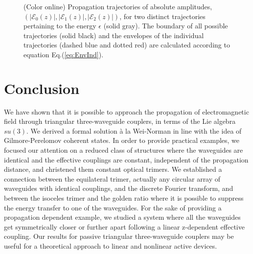 \documentclass[9pt,twocolumn,twoside]{osajnl}
\begin{document}
\begin{figure}[htbp]
	\centering
	\caption{(Color online) Propagation trajectories of absolute amplitudes, $(\vert \mathcal{E}_{0}(z) \vert, \vert \mathcal{E}_{1}(z) \vert, \vert \mathcal{E}_{2}(z) \vert )$,  for two 
		distinct trajectories pertaining to the energy $\epsilon$ (solid gray). The boundary of all possible trajectories (solid black) and the envelopes of the individual  trajectories (dashed blue and dotted red) are calculated according to equation Eq.(\ref{eq:EnvInd}).} 
	
	\label{fig:Fig8}
\end{figure}


\section{Conclusion}
We have shown that it is possible to approach the propagation of electromagnetic field through triangular three-waveguide couplers, in terms of the Lie algebra $su(3)$. 
We derived a formal solution \`a la Wei-Norman in line with the idea of Gilmore-Perelomov coherent states.
In order to provide practical examples, we focused our attention on a reduced class of structures where the waveguides are identical and the effective couplings are constant, independent of the propagation distance, and christened them constant optical trimers. 
We established a connection between the equilateral trimer, actually any circular array of waveguides with identical couplings, and the discrete Fourier transform, and between the isoceles trimer and the golden ratio where it is possible to suppress the energy transfer to one of the waveguides. 
For the sake of providing a propagation dependent example, we studied a system where all the waveguides get symmetrically closer or further apart following a linear z-dependent effective coupling.
Our results for passive triangular three-waveguide couplers may be useful for a theoretical approach to linear and nonlinear active devices.
\end{document}
